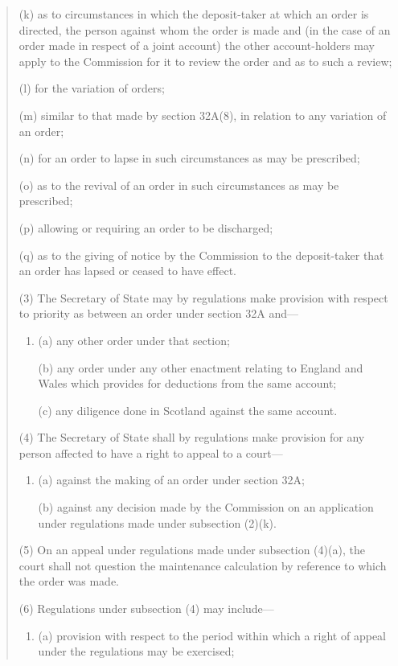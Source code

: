 \documentclass[a4paper]{article}
\begin{document}
\begin{quotation}
\begin{enumerate}
(k) as to circumstances in which the deposit-taker at which an order is directed,
the person against whom the order is made and (in the case of an order made
in respect of a joint account) the other account-holders may apply to the
Commission for it to review the order and as to
such a review;

(l) for the variation of orders;

(m) similar to that made by section 32A(8), in relation to any variation of an
order;

(n) for an order to lapse in such circumstances as may be prescribed;

(o) as to the revival of an order in such circumstances as may be prescribed;

(p) allowing or requiring an order to be discharged;

(q) as to the giving of notice by the Commission to the deposit-taker that an
order has lapsed or ceased to have effect.
\end{enumerate}

(3)
The Secretary of State may by regulations make provision with respect to priority as between an order under section 32A and---
\begin{enumerate}\item[]
(a) any other order under that section;

(b) any order under any other enactment relating to England and Wales which
provides for deductions from the same account;

(c) any diligence done in Scotland against the same account.
\end{enumerate}

(4)
The Secretary of State shall by regulations make provision for any person affected to have a right to appeal to a court---
\begin{enumerate}\item[]
(a) against the making of an order under section 32A;

(b) against any decision made by the Commission on an application
under regulations made under subsection (2)(k).
\end{enumerate}

(5)
On an appeal under regulations made under subsection (4)(a), the court shall not question the maintenance calculation by reference to which the order was made.

(6)
Regulations under subsection (4) may include---
\begin{enumerate}\item[]
(a) provision with respect to the period within which a right of appeal under the regulations may be exercised;


\end{enumerate}
\end{quotation}
\end{document}
